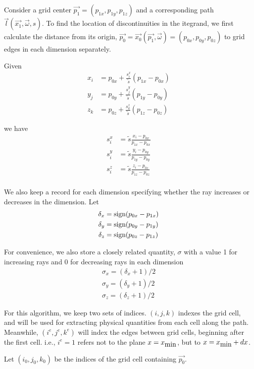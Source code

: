 Consider a grid center $\vec{p_1} = (p_{1x},p_{1y},p_{1z})$ and a corresponding path $\vec{l}(\vec{x_1}, \vec{\omega}, s)$.
To find the location of discontinuities in the itegrand, we first calculate the
distance from its origin, $\vec{p_0} = \vec{x_0}(\vec{p_1}, \vec{\omega}) = (p_{0x}, p_{0y}, p_{0z})$ to grid edges in each dimension
separately.

Given
\begin{align}
  x_i &= p_{0x} + \frac{s_i^x}{\tilde{s}}(p_{1x}-p_{0x}) \\
  y_j &= p_{0y} + \frac{s_j^y}{\tilde{s}}(p_{1y}-p_{0y}) \\
  z_k &= p_{0z} + \frac{s_k^z}{\tilde{s}}(p_{1z}-p_{0z})
\end{align}

we have
\begin{align}
  s_i^x &= \tilde{s}\frac{x_i-p_{0x}}{p_{1x}-p_{0x}} \\
  s_i^y &= \tilde{s}\frac{y_i-p_{0y}}{p_{1y}-p_{0y}} \\
  s_i^z &= \tilde{s}\frac{z_i-p_{0z}}{p_{1z}-p_{0z}} \\
\end{align}


We also keep a record for each dimension specifying whether the ray increases
or decreases in the dimension. Let
\begin{align}
  \delta_x &= \mbox{sign}(p_{0x}-p_{1x}) \\
  \delta_y &= \mbox{sign}(p_{0y}-p_{1y}) \\
  \delta_z &= \mbox{sign}(p_{0z}-p_{1z})
\end{align}

For convenience, we also store a closely related quantity, $\sigma$ with a value 1 for
increasing rays and 0 for decreasing rays in each dimension
\begin{align}
  \sigma_x = (\delta_x+1)/2 \\
  \sigma_y = (\delta_y+1)/2 \\
  \sigma_z = (\delta_z+1)/2
\end{align}

For this algorithm, we keep two sets of indices. $(i,j,k)$ indexes the grid
cell, and will be used for extracting physical quantities from each cell along
the path.
Meanwhile, $(i^e,j^e,k^e)$ will index the edges between grid cells, beginning
after the first cell. i.e., $i^e=1$ refers not to the plane $x=x_{\mbox{min}}$, but to $x=x_{\mbox{min}}+dx$.

Let $(i_0, j_0, k_0)$ be the indices of the grid cell containing $\vec{p_0}$.

